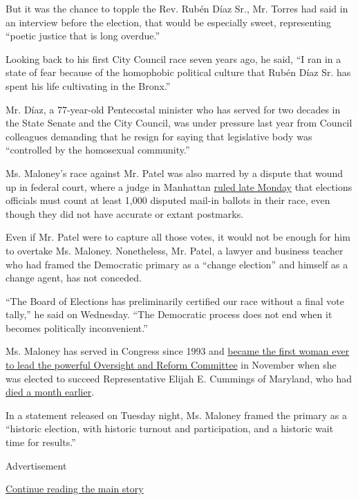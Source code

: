 But it was the chance to topple the Rev. Rubén Díaz Sr., Mr. Torres had
said in an interview before the election, that would be especially
sweet, representing ``poetic justice that is long overdue.''

Looking back to his first City Council race seven years ago, he said,
``I ran in a state of fear because of the homophobic political culture
that Rubén Díaz Sr. has spent his life cultivating in the Bronx.''

Mr. Díaz, a 77-year-old Pentecostal minister who has served for two
decades in the State Senate and the City Council, was under pressure
last year from Council colleagues demanding that he resign for saying
that legislative body was ``controlled by the homosexual community.''

Ms. Maloney's race against Mr. Patel was also marred by a dispute that
wound up in federal court, where a judge in Manhattan
\href{https://www.nytimes3xbfgragh.onion/2020/08/03/nyregion/nyc-congress-carolyn-maloney-ballots.html}{ruled
late Monday} that elections officials must count at least 1,000 disputed
mail-in ballots in their race, even though they did not have accurate or
extant postmarks.

Even if Mr. Patel were to capture all those votes, it would not be
enough for him to overtake Ms. Maloney. Nonetheless, Mr. Patel, a lawyer
and business teacher who had framed the Democratic primary as a ``change
election'' and himself as a change agent, has not conceded.

``The Board of Elections has preliminarily certified our race without a
final vote tally,'' he said on Wednesday. ``The Democratic process does
not end when it becomes politically inconvenient.''

Ms. Maloney has served in Congress since 1993 and
\href{https://www.nytimes3xbfgragh.onion/2019/11/20/us/politics/carolyn-maloney-oversight-committee.html}{became
the first woman ever to lead the powerful Oversight and Reform
Committee} in November when she was elected to succeed Representative
Elijah E. Cummings of Maryland, who had
\href{https://www.nytimes3xbfgragh.onion/2019/10/17/us/politics/elijah-cummings-death-illness.html}{died
a month earlier}.

In a statement released on Tuesday night, Ms. Maloney framed the primary
as a ``historic election, with historic turnout and participation, and a
historic wait time for results.''

Advertisement

\protect\hyperlink{after-bottom}{Continue reading the main story}

